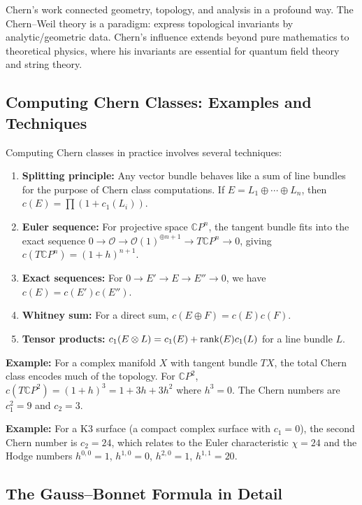 Chern's work connected geometry, topology, and analysis in a profound way. The Chern--Weil theory is a paradigm: express topological invariants by analytic/geometric data. Chern's influence extends beyond pure mathematics to theoretical physics, where his invariants are essential for quantum field theory and string theory.

\subsection*{Computing Chern Classes: Examples and Techniques}

Computing Chern classes in practice involves several techniques:

\begin{enumerate}
    \item \textbf{Splitting principle:} Any vector bundle behaves like a sum of line bundles for the purpose of Chern class computations. If $E = L_1 \oplus \cdots \oplus L_n$, then $c(E) = \prod (1 + c_1(L_i))$.
    \item \textbf{Euler sequence:} For projective space $\mathbb{C}P^n$, the tangent bundle fits into the exact sequence $0 \to \mathcal{O} \to \mathcal{O}(1)^{\oplus n+1} \to T\mathbb{C}P^n \to 0$, giving $c(T\mathbb{C}P^n) = (1+h)^{n+1}$.
    \item \textbf{Exact sequences:} For $0 \to E' \to E \to E'' \to 0$, we have $c(E) = c(E')c(E'')$.
    \item \textbf{Whitney sum:} For a direct sum, $c(E \oplus F) = c(E)c(F)$.
    \item \textbf{Tensor products:} $c_1(E \otimes L) = c_1(E) + \rank(E) c_1(L)$ for a line bundle $L$.
\end{enumerate}

\noindent\textbf{Example:} For a complex manifold $X$ with tangent bundle $TX$, the total Chern class encodes much of the topology. For $\mathbb{C}P^2$, $c(T\mathbb{C}P^2) = (1+h)^3 = 1 + 3h + 3h^2$ where $h^3 = 0$. The Chern numbers are $c_1^2 = 9$ and $c_2 = 3$.

\noindent\textbf{Example:} For a K3 surface (a compact complex surface with $c_1 = 0$), the second Chern number is $c_2 = 24$, which relates to the Euler characteristic $\chi = 24$ and the Hodge numbers $h^{0,0} = 1$, $h^{1,0} = 0$, $h^{2,0} = 1$, $h^{1,1} = 20$.

\subsection*{The Gauss--Bonnet Formula in Detail}

